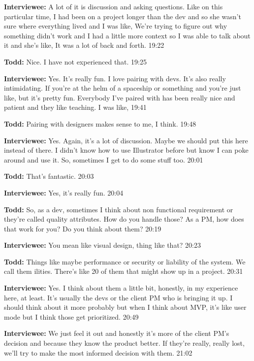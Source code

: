 \textbf{Interviewee:} A lot of it is discussion and asking questions. Like on this particular time, I had been on a project longer than the dev and so she wasn't sure where everything lived and I was like,  We're trying to figure out why something didn't work and I had a little more context so I was able to talk about it and she's like,  It was a lot of back and forth. 19:22

\textbf{Todd:} Nice. I have not experienced that. 19:25

\textbf{Interviewee:} Yes. It's really fun. I love pairing with devs. It's also really intimidating. If you're at the helm of a spaceship or something and you're just like,  but it's pretty fun. Everybody I've paired with has been really nice and patient and they like teaching. I was like,  19:41

\textbf{Todd:} Pairing with designers makes sense to me, I think. 19:48

\textbf{Interviewee:} Yes. Again, it's a lot of discussion. Maybe we should put this here instead of there. I didn't know how to use Illustrator before but know I can poke around and use it. So, sometimes I get to do some stuff too. 20:01

\textbf{Todd:} That's fantastic. 20:03

\textbf{Interviewee:} Yes, it's really fun. 20:04

\textbf{Todd:} So, as a dev, sometimes I think about non functional requirement or they're called quality attributes. How do you handle those? As a PM, how does that work for you? Do you think about them? 20:19

\textbf{Interviewee:} You mean like visual design, thing like that? 20:23

\textbf{Todd:} Things like maybe performance or security or liability of the system. We call them ilities. There's like 20 of them that might show up in a project. 20:31

\textbf{Interviewee:} Yes. I think about them a little bit, honestly, in my experience here, at least. It's usually the devs or the client PM who is bringing it up. I should think about it more probably but when I think about MVP, it's like user mode but I think those get prioritized. 20:49

\textbf{Interviewee:} We just feel it out and honestly it's more of the client PM's decision and because they know the product better. If they're really, really lost, we'll try to make the most informed decision with them. 21:02

